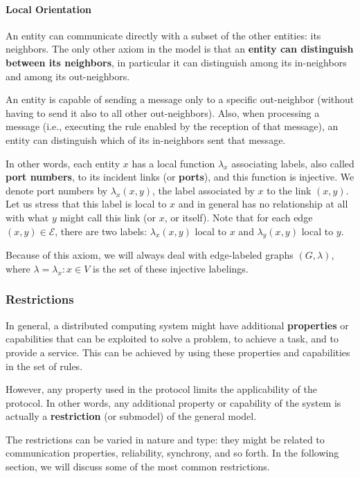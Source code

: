 \paragraph{Local Orientation}
An entity can communicate directly with a subset of the other entities: its neighbors. The only other axiom in the model is that an \textbf{entity can distinguish between its neighbors}, in particular it can distinguish among its in-neighbors and among its out-neighbors.

An entity is capable of sending a message only to a specific out-neighbor (without having to send it also to all other out-neighbors). Also, when processing a message (i.e., executing the rule enabled by the reception of that message), an entity can distinguish which of its in-neighbors sent that message. 

In other words, each entity $x$ has a local function $\lambda_x$ associating labels, also called \textbf{port numbers}, to its incident links (or \textbf{ports}), and this function is injective. We denote port numbers by $\lambda_x(x,y)$, the label associated by $x$ to the link $(x, y)$. Let us stress that this label is local to $x$ and in general has no relationship at all with what $y$ might call this link (or $x$, or itself). Note that for each edge $(x, y) \in \mathcal{E}$, there are two labels: $\lambda_x(x, y)$ local to $x$ and $\lambda_y(x, y)$ local to $y$. 


Because of this axiom, we will always deal with edge-labeled graphs $( G, \lambda)$, where $\lambda ={\lambda_x : x \in V}$ is the set of these injective labelings.

\subsubsection{Restrictions}
In general, a distributed computing system might have additional \textbf{properties} or capabilities that can be exploited to solve a problem, to achieve a task, and to provide a service. This can be achieved by using these properties and capabilities in the set of rules. 

However, any property used in the protocol limits the applicability of the protocol. In other words, any additional property or capability of the system is actually a \textbf{restriction} (or submodel) of the general model.

The restrictions can be varied in nature and type: they might be related to communication properties, reliability, synchrony, and so forth. In the following section, we will discuss some of the most common restrictions.

